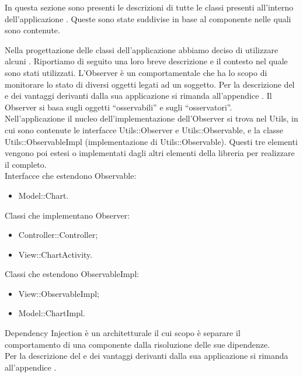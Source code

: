 		In questa sezione sono presenti le descrizioni di tutte le classi presenti all'interno dell'applicazione . Queste sono state suddivise in base al componente nelle quali sono contenute.
		
		
		
Nella progettazione delle classi dell'applicazione abbiamo deciso di utilizzare alcuni . Riportiamo di seguito una loro breve descrizione e il contesto nel quale sono stati utilizzati.
	L'Observer è un  comportamentale che ha lo scopo di monitorare lo stato di diversi oggetti legati ad un soggetto.
	Per la descrizione del  e dei vantaggi derivanti dalla sua applicazione si rimanda all'appendice .
	Il  Observer si basa sugli oggetti “osservabili” e sugli “osservatori”. \\ Nell'applicazione  il nucleo dell'implementazione dell'Observer si trova nel  Utils, in cui sono contenute le interfacce Utils::Observer e Utils::Observable, e la classe Utils::ObservableImpl (implementazione di Utils::Observable). Questi tre elementi vengono poi estesi o implementati dagli altri elementi della libreria per realizzare il  completo.\\
	Interfacce che estendono Observable:
	\begin{itemize}
	\item Model::Chart.
	\end{itemize}
	Classi che implementano Observer:
	\begin{itemize}
	\item Controller::Controller;
	\item View::ChartActivity.
	\end{itemize}
	Classi che estendono ObservableImpl:
	\begin{itemize}
	\item View::ObservableImpl;
	\item Model::ChartImpl.
	\end{itemize}
	Dependency Injection è un  architetturale il cui scopo è separare il comportamento di una componente dalla risoluzione delle sue dipendenze.\\
	Per la descrizione del  e dei vantaggi derivanti dalla sua applicazione si rimanda all'appendice .
